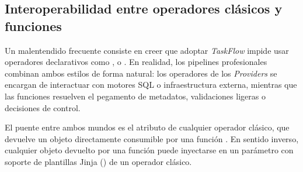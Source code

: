 \subsection{Interoperabilidad entre operadores clásicos y funciones \texorpdfstring{}{@task}}

Un malentendido frecuente consiste en creer que adoptar \textit{TaskFlow} impide usar operadores declarativos como ,  o . En realidad, los pipelines profesionales combinan ambos estilos de forma natural: los operadores de los \textit{Providers} se encargan de interactuar con motores SQL o infraestructura externa, mientras que las funciones  resuelven el pegamento de metadatos, validaciones ligeras o decisiones de control.

El puente entre ambos mundos es el atributo  de cualquier operador clásico, que devuelve un objeto  directamente consumible por una función . En sentido inverso, cualquier objeto  devuelto por una función  puede inyectarse en un parámetro con soporte de plantillas Jinja () de un operador clásico.

